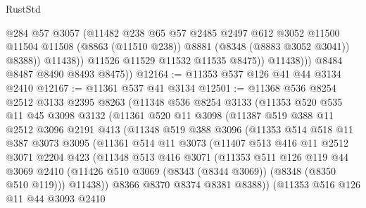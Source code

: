 \begin{lexlean}{RustStd}
\begin{coremodule}
{\begin{coremodule}
{{{{{{{{{{{{{{{{{{{{{{{{{{{{{{{{{{{{{{{{{{{{{{{{{{                        @284
                        @57
                        @3057
                        (@11482
                          @238
                          @65
                          @57
                          @2485
                          @2497
                          @612
                          @3052
                          @11500
                          @11504
                          @11508
                          (@8863 (@11510 @238))
                          @8881
                          (@8348 (@8883 @3052 @3041))
                          @8388))
                      @11438))
                  @11526
                  @11529
                  @11532
                  @11535
                  @8475))
              @11438)))
        @8484
        @8487
        @8490
        @8493
        @8475))
@12164 := @11353 @537 @126 @41 @44 @3134 @2410
@12167 := @11361 @537 @41 @3134
@12501 := @11368
    @536
    @8254
    @2512
    @3133
    @2395
    @8263
    (@11348
      @536
      @8254
      @3133
      (@11353
        @520
        @535
        @11
        @45
        @3098
        @3132
        (@11361
          @520
          @11
          @3098
          (@11387
            @519
            @388
            @11
            @2512
            @3096
            @2191
            @413
            (@11348
              @519
              @388
              @3096
              (@11353
                @514
                @518
                @11
                @387
                @3073
                @3095
                (@11361
                  @514
                  @11
                  @3073
                  (@11407
                    @513
                    @416
                    @11
                    @2512
                    @3071
                    @2204
                    @423
                    (@11348
                      @513
                      @416
                      @3071
                      (@11353
                        @511
                        @126
                        @119
                        @44
                        @3069
                        @2410
                        (@11426 @510 @3069 (@8343 (@8344 @3069)) (@8348 (@8350 @510 @119)))
                        @11438))
                    @8366
                    @8370
                    @8374
                    @8381
                    @8388))
                (@11353
                  @516
                  @126
                  @11
                  @44
                  @3093
                  @2410
}}}}}}}}}}}}}}}}}}}}}}}}}}}}}}}}}}}}}}}}}}}}}}}}}}
\end{coremodule}}
\end{coremodule}
\end{lexlean}
